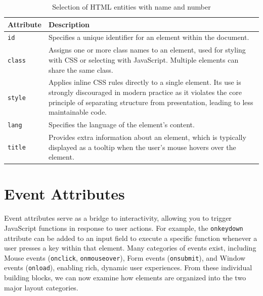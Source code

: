 \documentclass{scrbook}
\begin{document}
\begin{table}[h!]
    \centering
    \begin{tabularx}{\textwidth}{|p{5em}|X|} \hline
        \textbf{Attribute} & \textbf{Description}  \\ \hline

        \texttt{id} &
        Specifies a unique identifier for an element within the document.
        \\ \hline

        \texttt{class} &
        Assigns one or more class names to an element, used for styling with CSS or selecting with JavaScript. Multiple elements can share the same class.
        \\ \hline

        \texttt{style} &
        Applies inline CSS rules directly to a single element. Its use is strongly discouraged in modern practice as it violates the core principle of separating structure from presentation, leading to less maintainable code.
        \\ \hline

        \texttt{lang} &
        Specifies the language of the element's content.
        \\ \hline

        \texttt{title} &
        Provides extra information about an element, which is typically displayed as a tooltip when the user's mouse hovers over the element.
        \\ \hline
    \end{tabularx}
    \caption{Selection of HTML entities with name and number}
\end{table}

\section{Event Attributes}

Event attributes serve as a bridge to interactivity, allowing you to trigger JavaScript functions in response to user actions. For example, the \texttt{onkeydown} attribute can be added to an input field to execute a specific function whenever a user presses a key within that element. Many categories of events exist, including Mouse events (\texttt{onclick}, \texttt{onmouseover}), Form events (\texttt{onsubmit}), and Window events (\texttt{onload}), enabling rich, dynamic user experiences. From these individual building blocks, we can now examine how elements are organized into the two major layout categories.
\end{document}
